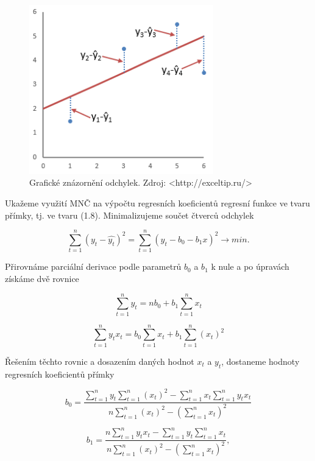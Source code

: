 \documentclass[a4paper,12pt,twoside]{scrreprt}
\begin{document}
\begin{figure}[h]
  \centering
  \includegraphics[width=8cm]{pictures/odchylky.png}
  \caption{Grafické znázornění odchylek. Zdroj: <http://exceltip.ru/>}
  \label{fig:odchylky}
\end{figure}

Ukažeme využití MNČ na výpočtu regresních koeficientů regresní funkce ve tvaru přímky, tj. ve tvaru (1.8). Minimalizujeme součet čtverců odchylek 

\begin{equation}
\sum_{t=1}^{n}(y_t - \hat{y_t})^2 = \sum_{t=1}^{n}(y_t - b_0 - b_1x)^2 \rightarrow min. 
\end{equation}

Přirovnáme parciální derivace podle parametrů $b_0$ a $b_1$ k nule a po úpravách získáme dvě rovnice

\begin{equation}
\sum_{t=1}^{n}y_t = nb_0 + b_1\sum_{t=1}^{n}x_t
\end{equation}

\begin{equation}
\sum_{t=1}^{n}y_tx_t = b_0\sum_{t=1}^{n}x_t + b_1\sum_{t=1}^{n}(x_t)^2
\end{equation}

Řešením těchto rovnic a dosazením daných hodnot $x_t$ a $y_t$, dostaneme hodnoty regresních koeficientů přímky

\begin{equation}
b_0 = \frac{\sum_{t=1}^{n}y_t\sum_{t=1}^{n}(x_t)^2 - \sum_{t=1}^{n}x_t\sum_{t=1}^{n}y_tx_t} {n\sum_{t=1}^{n}(x_t)^2 - (\sum_{t=1}^{n}x_t)^2} 
\end{equation}

\begin{equation}
b_1 = \frac{n\sum_{t=1}^{n}y_tx_t - \sum_{t=1}^{n}y_t\sum_{t=1}^{n}x_t} {n\sum_{t=1}^{n}(x_t)^2 - (\sum_{t=1}^{n}x_t)^2},
\end{equation}
\end{document}
